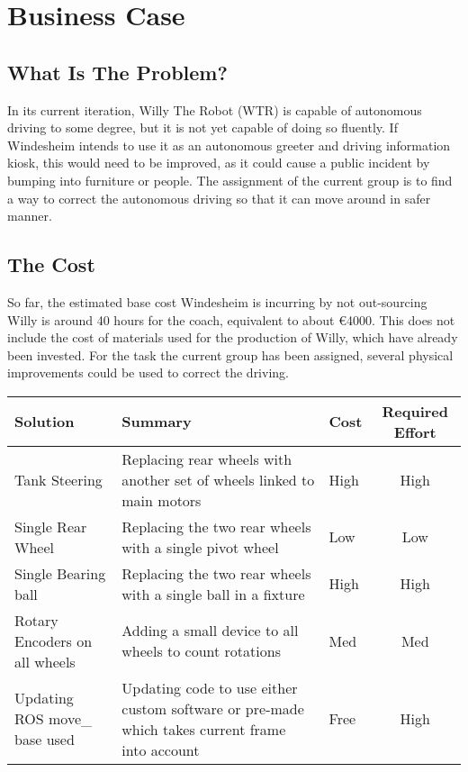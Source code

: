 \section{Business Case}


\subsection{What Is The Problem?}
In its current iteration, Willy The Robot (WTR) is capable of autonomous driving to some degree, but it is not yet capable of doing so fluently.
If Windesheim intends to use it as an autonomous greeter and driving information kiosk, this would need to be improved, as it could cause a public incident by bumping into furniture or people.
The assignment of the current group is to find a way to correct the autonomous driving so that it can move around in safer manner.

\subsection{The Cost}
So far, the estimated base cost Windesheim is incurring by not out-sourcing Willy is around 40 hours for the coach, equivalent to about \euro 4000.
This does not include the cost of materials used for the production of Willy, which have already been invested.
For the task the current group has been assigned, several physical improvements could be used to correct the driving.

\begin{tabular}{|L{3cm}|L{6cm}|l|c|}
\hline
Solution		  & Summary 															  & Cost 	&Required Effort \\ \hline
Tank Steering & Replacing rear wheels with another set of wheels linked to main motors & High 	& High			\\ \hline
Single Rear Wheel & Replacing the two rear wheels with a single pivot wheel 		    	  & Low		& Low			\\ \hline
Single Bearing ball & Replacing the two rear wheels with a single ball in a fixture   & High  	& High			\\ \hline
Rotary Encoders on all wheels & Adding a small device to all wheels to count rotations & Med   	& Med			\\ \hline
Updating ROS move\_ base used & Updating code to use either custom software or pre-made which takes current frame into account & Free & High \\ \hline
\end{tabular}


